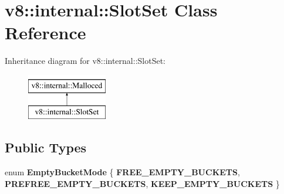 \hypertarget{classv8_1_1internal_1_1SlotSet}{}\section{v8\+:\+:internal\+:\+:Slot\+Set Class Reference}
\label{classv8_1_1internal_1_1SlotSet}
Inheritance diagram for v8\+:\+:internal\+:\+:Slot\+Set\+:\begin{figure}[H]
\begin{center}
\leavevmode
\includegraphics[height=2.000000cm]{classv8_1_1internal_1_1SlotSet}
\end{center}
\end{figure}
\subsection*{Public Types}
\begin{DoxyCompactItemize}
\item 
\mbox{\label{classv8_1_1internal_1_1SlotSet_a88761222bc45aa62ceaa255c923eb9ce}} 
enum {\bfseries Empty\+Bucket\+Mode} \{ {\bfseries F\+R\+E\+E\+\_\+\+E\+M\+P\+T\+Y\+\_\+\+B\+U\+C\+K\+E\+TS}, 
{\bfseries P\+R\+E\+F\+R\+E\+E\+\_\+\+E\+M\+P\+T\+Y\+\_\+\+B\+U\+C\+K\+E\+TS}, 
{\bfseries K\+E\+E\+P\+\_\+\+E\+M\+P\+T\+Y\+\_\+\+B\+U\+C\+K\+E\+TS}
 \}
\end{DoxyCompactItemize}
